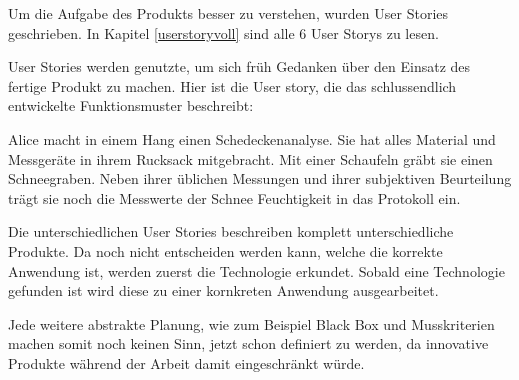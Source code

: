 Um die Aufgabe des Produkts besser zu verstehen, wurden User Stories geschrieben. In Kapitel \ref{userstoryvoll} sind alle 6 User Storys zu lesen.

User Stories werden genutzte, um sich früh Gedanken über den Einsatz des fertige Produkt zu machen. Hier ist die User story, die das schlussendlich entwickelte Funktionsmuster beschreibt:

Alice macht in einem Hang einen Schedeckenanalyse. Sie hat alles Material und Messgeräte in ihrem Rucksack mitgebracht. Mit einer Schaufeln gräbt sie einen Schneegraben. Neben ihrer üblichen Messungen und ihrer subjektiven Beurteilung trägt sie noch die Messwerte der Schnee Feuchtigkeit in das Protokoll ein.

Die unterschiedlichen User Stories beschreiben komplett unterschiedliche Produkte. Da noch nicht entscheiden werden kann, welche die korrekte Anwendung ist, werden zuerst die Technologie erkundet. Sobald eine Technologie gefunden ist wird diese zu einer kornkreten Anwendung ausgearbeitet.

Jede weitere abstrakte Planung, wie zum Beispiel Black Box und Musskriterien machen somit noch keinen Sinn, jetzt schon definiert zu werden, da innovative Produkte während der Arbeit damit eingeschränkt würde.



\iffalse

Um die Aufgabe der produktentwicklung besser zu verstehen, wurden User storys geschrieben. In \ref{userstoryvoll} sind alle 6 User Storys.

das ziel der Userstorys ist es fruh sich gedanken uber das fertige produkt zu machen. Hier ist die User story die das schlussendlichten entwickelten sensor beschreibt.

Alice macht an einem hang einen schedeckenanalyse, mit der schaufeln. neben ihrer subkektiven beurteilung tragt sie noch die messwerte der schneefeuchtikeit ein.


Die Userstorys beschreiben komplett unterschiedliche Produkte. da ich nicht entscheiden kann oder will, welches die korrekte Anwendung ist, werde ich zu erst die Technologie erkunden und dann die anwendung in ein Produkt finden.

jede weiteren pflichenheft aktivitaten, wie zum beispiel black box, Musskriteren, usw. machen keinen sinn jetzt schon definiert zu werden. da spanneden Entdecknugen währen der arbeit damit eingeschränkt werden.

\fi
